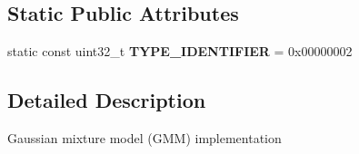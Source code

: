 \subsection*{Static Public Attributes}
\begin{DoxyCompactItemize}
\item 
\hypertarget{classspeech_1_1clustering_1_1GaussianMixtureModel_a5e24f49d58af9b9eededc498b5c63ad0}{static const uint32\+\_\+t {\bfseries T\+Y\+P\+E\+\_\+\+I\+D\+E\+N\+T\+I\+F\+I\+E\+R} = 0x00000002}\label{classspeech_1_1clustering_1_1GaussianMixtureModel_a5e24f49d58af9b9eededc498b5c63ad0}

\end{DoxyCompactItemize}


\subsection{Detailed Description}
Gaussian mixture model (G\+M\+M) implementation 

